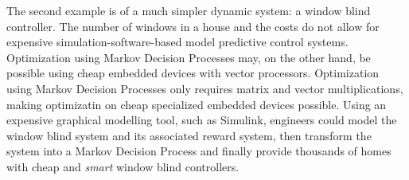 The second example is of a much simpler dynamic system: a window blind controller. The number of windows in a house and the costs do not allow for expensive simulation-software-based model predictive control systems. Optimization using Markov Decision Processes may, on the other hand, be possible using cheap embedded devices with vector processors. Optimization using Markov Decision Processes only requires matrix and vector multiplications, making optimizatin on cheap specialized embedded devices possible. Using an expensive graphical modelling tool, such as Simulink, engineers could model the window blind system and its associated reward system, then transform the system into a Markov Decision Process and finally provide thousands of homes with cheap and \textit{smart} window blind controllers.


